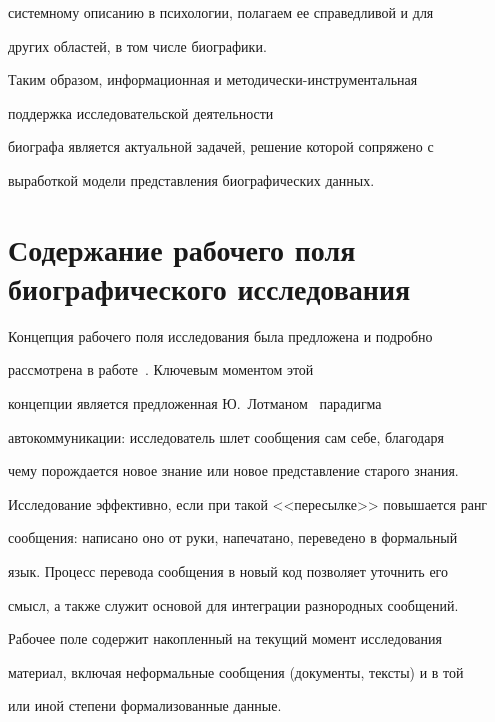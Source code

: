 системному описанию в психологии, полагаем ее справедливой и для 


других областей, в том числе биографики. 


     


     Таким образом, информационная и методически-инструментальная  


     поддержка исследовательской деятельности 


биографа является актуальной задачей, решение которой сопряжено с 


выработкой модели представления биографических данных.





\section{Содержание рабочего поля биографического исследования}


     


     Концепция рабочего поля исследования была предложена и подробно 


рас\-смот\-ре\-на в работе~\cite{2-2-12}.  Ключевым моментом этой 


концепции является пред\-ло\-жен\-ная Ю.~Лотманом~\cite{4-2-12} парадигма 


автокоммуникации:  исследователь шлет сообщения сам себе, благодаря 


чему порождается новое знание или новое пред\-став\-ле\-ние старого знания. 


Исследование эффективно, если при такой  <<пересылке>> повышается ранг 


сообщения:  написано оно от руки, напечатано, переведено в формальный 


язык. Процесс перевода сообщения в новый код позволяет уточнить его 


смысл, а также служит основой для интеграции разнородных сообщений.


     


     Рабочее поле содержит накопленный на текущий момент исследования 


материал, включая неформальные сообщения (документы, тексты)  и в той 


или иной степени формализованные данные.


     


